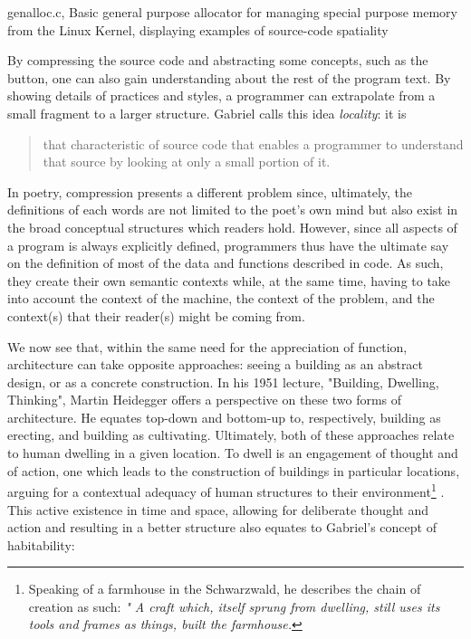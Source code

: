 \begin{listing}
    \inputminted[]{c}{./corpus/compressed.c}
    \caption{genalloc.c, Basic general purpose allocator for managing special purpose memory from the Linux Kernel, displaying examples of source-code spatiality \citep{muratori_semantic_2014}}
    \label{code:compressed}
\end{listing}

By compressing the source code and abstracting some concepts, such as the button, one can also gain understanding about the rest of the program text. By showing details of practices and styles, a programmer can extrapolate from a small fragment to a larger structure. Gabriel calls this idea \emph{locality}: it is

\begin{quote}
    that characteristic of source code that enables a programmer to understand that source by looking at only a small portion of it. \citep{gabriel_patterns_1998}
\end{quote}

In poetry, compression presents a different problem since, ultimately, the definitions of each words are not limited to the poet's own mind but also exist in the broad conceptual structures which readers hold. However, since all aspects of a program is always explicitly defined, programmers thus have the ultimate say on the definition of most of the data and functions described in code. As such, they create their own semantic contexts while, at the same time, having to take into account the context of the machine, the context of the problem, and the context(s) that their reader(s) might be coming from.

We now see that, within the same need for the appreciation of function, architecture can take opposite approaches: seeing a building as an abstract design, or as a concrete construction. In his 1951 lecture, "Building, Dwelling, Thinking", Martin Heidegger offers a perspective on these two forms of architecture. He equates top-down and bottom-up to, respectively, building as erecting, and building as cultivating. Ultimately, both of these approaches relate to human dwelling in a given location. To dwell is an engagement of thought and of action, one which leads to the construction of buildings in particular locations, arguing for a contextual adequacy of human structures to their environment\footnote{Speaking of a farmhouse in the Schwarzwald, he describes the chain of creation as such: \emph{" A craft which, itself sprung from dwelling, still uses its tools and frames as things, built the farmhouse.}} \citep{heidegger_building_1975}. This active existence in time and space, allowing for deliberate thought and action and resulting in a better structure also equates to Gabriel's concept of habitability:

